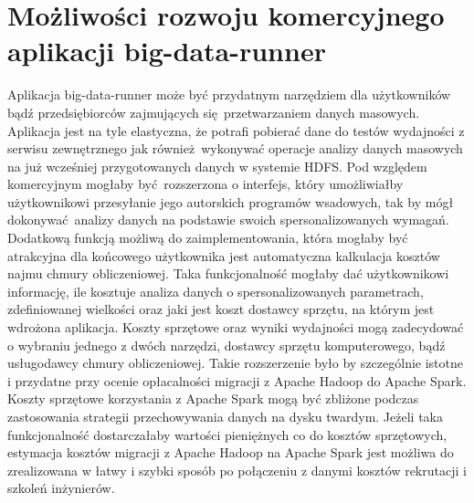 \section{Możliwości rozwoju komercyjnego aplikacji big-data-runner}
Aplikacja big-data-runner może być przydatnym narzędziem dla użytkowników bądź przedsiębiorców zajmujących się przetwarzaniem danych masowych. Aplikacja jest na tyle elastyczna, że potrafi pobierać dane do testów wydajności z serwisu zewnętrznego jak również wykonywać operacje analizy danych masowych na już wcześniej przygotowanych danych w systemie HDFS. Pod względem komercyjnym mogłaby być rozszerzona o interfejs, który umożliwiałby użytkownikowi przesyłanie jego autorskich programów wsadowych, tak by mógł dokonywać analizy danych na podstawie swoich spersonalizowanych wymagań. Dodatkową funkcją możliwą do zaimplementowania, która mogłaby być atrakcyjna dla końcowego użytkownika jest automatyczna kalkulacja kosztów najmu chmury obliczeniowej. Taka funkcjonalność mogłaby dać użytkownikowi informację, ile kosztuje analiza danych o spersonalizowanych parametrach, zdefiniowanej wielkości oraz jaki jest koszt dostawcy sprzętu, na którym jest wdrożona aplikacja. Koszty sprzętowe oraz wyniki wydajności mogą zadecydować o wybraniu jednego z dwóch narzędzi, dostawcy sprzętu komputerowego, bądź usługodawcy chmury obliczeniowej. Takie rozszerzenie było by szczególnie istotne i przydatne przy ocenie opłacalności migracji z Apache Hadoop do Apache Spark. Koszty sprzętowe korzystania z Apache Spark mogą być zbliżone podczas zastosowania strategii przechowywania danych na dysku twardym. Jeżeli taka funkcjonalność dostarczałaby wartości pieniężnych co do kosztów sprzętowych, estymacja kosztów migracji z Apache Hadoop na Apache Spark jest możliwa do zrealizowana w łatwy i szybki sposób po połączeniu z danymi kosztów rekrutacji i szkoleń inżynierów. 